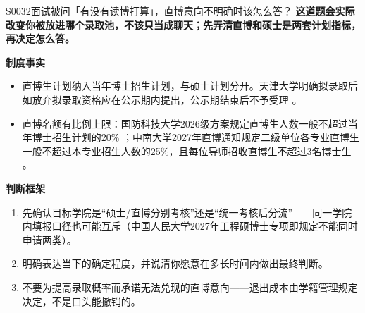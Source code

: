 \begin{qa}{S0032}{面试被问「有没有读博打算」，直博意向不明确时该怎么答？}
\textbf{这道题会实际改变你被放进哪个录取池，不该只当成聊天；先弄清直博和硕士是两套计划指标，再决定怎么答。}

\textbf{制度事实}
\begin{itemize}
  \item 直博生计划纳入当年博士招生计划，与硕士计划分开。天津大学明确拟录取后如放弃拟录取资格应在公示期内提出，公示期结束后不予受理 。
  \item 直博名额有比例上限：国防科技大学2026级方案规定直博生人数一般不超过当年博士招生计划的20\% ；中南大学2027年直博通知规定二级单位各专业直博生一般不超过本专业招生人数的25\%，且每位导师招收直博生不超过3名博士生 。
\end{itemize}

\textbf{判断框架}
\begin{enumerate}
  \item 先确认目标学院是“硕士/直博分别考核”还是“统一考核后分流”——同一学院内填报口径也可能互斥（中国人民大学2027年工程硕博士专项即规定不能同时申请两类）。
  \item 明确表达当下的确定程度，并说清你愿意在多长时间内做出最终判断。
  \item 不要为提高录取概率而承诺无法兑现的直博意向——退出成本由学籍管理规定决定，不是口头能撤销的。
\end{enumerate}
\end{qa}

